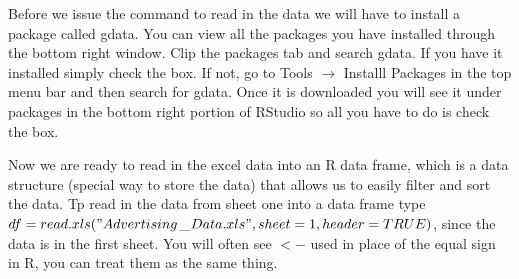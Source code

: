 \documentclass[11pt]{article}
\begin{document}
Before we issue the command to read in the data we will have to install a package called gdata. You can view all the packages you have installed through the bottom right window.  Clip the packages tab and search gdata.  If you have it installed simply check the box. If not, go to Tools $\rightarrow$ Installl Packages in the top menu bar and then search for gdata.  Once it is downloaded you will see it under packages in the bottom right portion of RStudio so all you have to do is check the box. 

Now we are ready to read in the excel data into an R data frame, which is a data structure (special way to store the data) that allows us to easily filter and sort the data.  Tp read in the data from sheet one into a data frame type $ df = read.xls ("Advertising$\_$Data.xls", sheet = 1, header = TRUE)$, since the data is in the first sheet.  You will often see $<-$ used in place of the equal sign in R, you can treat them as the same thing.  
\end{document}
